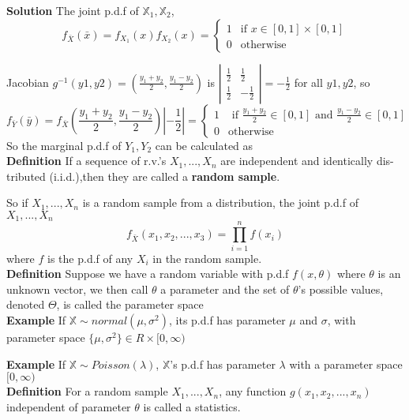 \documentclass[a4paper,12pt]{article}
\begin{document}
\textbf{Solution}
The joint p.d.f of $\mathbb{X}_1, \mathbb{X}_2$,
$$f_{\bar{X}}(\bar{x}) = f_{X_1}(x)f_{X_2}(x) = 
\begin{cases}
   1  & \text{if } x \in [0,1] \times [0,1] \\
   0 & \text{otherwise}
  \end{cases}
$$

Jacobian  $g^{-1}(y1, y2) = (\frac{y_1+y_2}{2}, \frac{y_1-y_2}{2})$ is
$\left| \begin{array}{ccc}
\frac{1}{2} & \frac{1}{2} \\
\frac{1}{2} & -\frac{1}{2} \end{array} \right| = -\frac{1}{2}$ for all $y1, y2$, so
$$f_{\bar{Y}}(\bar{y}) = f_{\bar{X}}(\frac{y_1+y_2}{2}, \frac{y_1-y_2}{2})| -\frac{1}{2} | = 
\begin{cases}
1 & \text{ if } \frac{y_1+y_2}{2} \in [0,1] \text{ and } \frac{y_1-y_2}{2} \in [0,1]\\
0 & \text{otherwise}

\end{cases}
$$
So the marginal p.d.f of $Y_1, Y_2$ can be calculated as\\

\textbf{Definition} If a sequence of r.v.’s $X_1, ..., X_n$ are independent and identically dis-
tributed (i.i.d.),then they are called a \textbf{random sample}.

So if $X_1, ..., X_n$ is a random sample from a distribution, the joint p.d.f of $X_1, ..., X_n$
$$f_{\bar{X}}(x_1, x_2, ..., x_3) =  \prod_{i=1}^n f(x_i)$$
where $f$ is the p.d.f of any $X_i$ in the random sample.\\
 
\textbf{Definition}
Suppose we have a random variable with p.d.f $f(x, \theta)$ where $\theta$ is an unknown vector, we then call $\theta$ a parameter and the set of $\theta$'s possible values, denoted $\Theta$, is called the parameter space\\

\textbf{Example}
If $\mathbb{X} \sim normal(\mu, \sigma^2)$, its p.d.f has parameter $\mu$ and $\sigma$, with parameter space $\{\mu, \sigma^2\} \in R \times
[0, \infty)$

\textbf{Example}
If $\mathbb{X} \sim Poisson(\lambda)$, $\mathbb{X}$'s p.d.f has parameter $\lambda$ with a parameter space $[0, \infty)$\\

\textbf{Definition}
For a random sample $X_1, ..., X_n$, any function $g(x_1, x_2, ..., x_n)$ independent of parameter $\theta$ is called a statistics.\\
\end{document}
